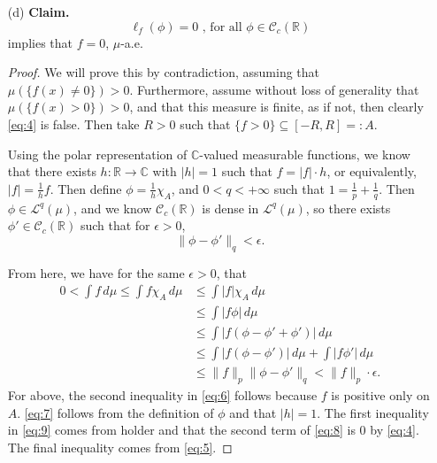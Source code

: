 \documentclass[12pt]{article}
\newcommand{\R}{\mathbb{R}}
\newcommand{\C}{\mathbb{C}}
\newcommand{\eq}[1]{\begin{equation*}#1\end{equation*}}
\newcommand{\qeq}[1]{\begin{equation}#1\end{equation}}
\newcommand{\qal}[1]{\begin{align}#1\end{align}}
\newcommand{\loc}{\mathcal{L}^p_\text{loc} (\mu)}
\newcommand{\elp}{\mathcal{L}^p (\mu)}
\newcommand{\clc}{\mathcal{C}_c(\R)}
\begin{document}
\begin{itemize}
    \begin{proof}
        To show that $\ell_f$ is well defined, we must show that $\ell_f(\phi) < +\infty$ for all $f$ and $\phi$. To do this, for $1 \leq q < +\infty$ such that $1 = \frac{1}{p} + \frac{1}{q}$, observe that
        \eq{\ell_f(\phi) \leq \int |f \phi|\,d\mu = \int_K |f \phi|\,d\mu \leq \|f\chi_K\|_p \|\phi\|_q < +\infty.}
        For the above, $K$ is the compact support of $\phi$, meaning $|f\phi|$ is supported on $K$, so the equality holds. The second inequality comes from holder. For the final inequality, the first factor is finite because $f \in \loc$, which by (a) implies $f\chi_K \in \elp$. The second factor is finite because $\phi \in \clc$. This shows well-definedness of $\ell_f$.

        Additionally, we know $\ell_f$ maps to $\R$ and not $\overline{\R}$ by the above, so $\ell_f$ is a linear functional if it is linear. But linearity of $\ell_f$ follows quite simply from linearity of the integral.
    \end{proof}

    \item [(d)] \textbf{Claim. }
    \qeq{\ell_f (\phi) = 0 \text{ , for all } \phi \in \clc \label{eq:4}}
    implies that $f = 0$, $\mu$-a.e.

    \begin{proof}
        We will prove this by contradiction, assuming that $\mu(\{f(x) \neq 0\}) > 0.$ Furthermore, assume without loss of generality that $\mu(\{f(x) > 0\}) > 0$, and that this measure is finite, as if not, then clearly \eqref{eq:4} is false. Then take $R > 0$ such that $\{f > 0\} \subseteq [-R, R] =: A$.

        Using the polar representation of $\C$-valued measurable functions, we know that there exists $h : \R \to \C$ with $|h| = 1$ such that $f = |f| \cdot h$, or equivalently, $|f| = \frac{1}{h} f$. Then define $\phi = \frac{1}{h} \chi_A$, and $0 < q < +\infty$ such that $1 = \frac{1}{p} + \frac{1}{q}$. Then $\phi \in \mathcal{L}^q(\mu)$, and we know $\clc$ is dense in $\mathcal{L}^q(\mu)$, so there exists $\phi' \in \clc$ such that for $\epsilon > 0$,
        \qeq{\|\phi - \phi'\|_q < \epsilon.\label{eq:5}}

        From here, we have for the same $\epsilon > 0$, that
        \qal{0 < \int f \,d\mu \leq \int f \chi_A \,d\mu &\leq \int |f| \chi_A \,d\mu \label{eq:6}\\
        &\leq \int |f \phi| \,d\mu \label{eq:7}\\
        &\leq \int |f(\phi - \phi' + \phi')| \,d\mu \nonumber \\
        &\leq \int |f(\phi-\phi')| \,d\mu + \int |f \phi'| \,d\mu \label{eq:8}\\
        &\leq \|f\|_p \|\phi - \phi'\|_q <\|f\|_p \cdot \epsilon. \label{eq:9}}
        For above, the second inequality in \eqref{eq:6} follows because $f$ is positive only on $A$. \newline \eqref{eq:7} follows from the definition of $\phi$ and that $|h| = 1$. The first inequality in \eqref{eq:9} comes from holder and that the second term of \eqref{eq:8} is 0 by \eqref{eq:4}. The final inequality comes from \eqref{eq:5}.


\end{proof}
\end{itemize}
\end{document}
